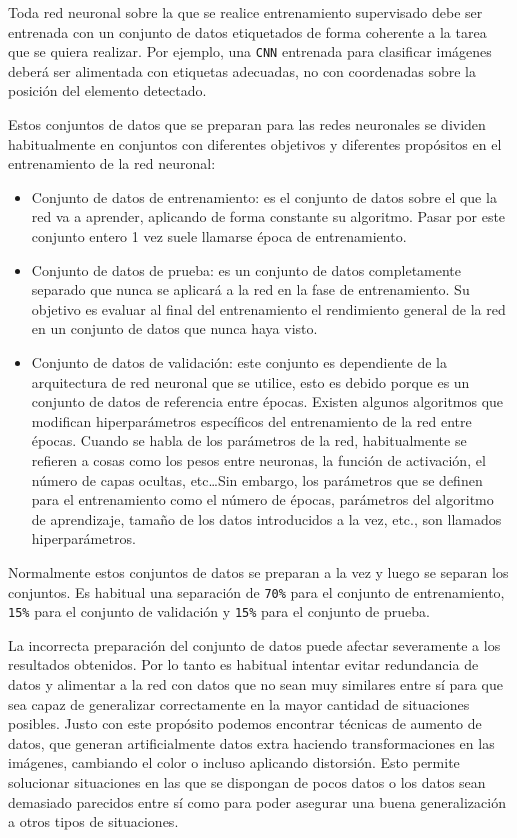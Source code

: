 Toda red neuronal sobre la que se realice entrenamiento supervisado debe ser entrenada con un conjunto de datos etiquetados de forma coherente a la tarea que se quiera realizar. Por ejemplo, una \texttt{CNN} 
entrenada para clasificar imágenes deberá ser alimentada con etiquetas adecuadas, no con coordenadas sobre la posición del elemento detectado.

Estos conjuntos de datos que se preparan para las redes neuronales se dividen habitualmente en conjuntos con diferentes objetivos y diferentes propósitos en el entrenamiento de la red neuronal:

\begin{itemize}
    \item Conjunto de datos de entrenamiento: es el conjunto de datos sobre el que la red va a aprender, aplicando de forma constante su algoritmo. Pasar por este conjunto entero 1 vez suele llamarse época 
    de entrenamiento.
    \item Conjunto de datos de prueba: es un conjunto de datos completamente separado que nunca se aplicará a la red en la fase de entrenamiento. Su objetivo es evaluar al final del entrenamiento el 
    rendimiento general de la red en un conjunto de datos que nunca haya visto.
    \item Conjunto de datos de validación: este conjunto es dependiente de la arquitectura de red neuronal que se utilice, esto es debido porque es un conjunto de datos de referencia entre épocas. Existen 
    algunos algoritmos que modifican hiperparámetros específicos del entrenamiento de la red entre épocas.\newline
    Cuando se habla de los parámetros de la red, habitualmente se refieren a cosas como los pesos entre neuronas, la función de activación, el número de capas ocultas, etc\dots Sin embargo, los parámetros 
    que se definen para el entrenamiento como el número de épocas, parámetros del algoritmo de aprendizaje, tamaño de los datos introducidos a la vez, etc., son llamados hiperparámetros.
\end{itemize}

Normalmente estos conjuntos de datos se preparan a la vez y luego se separan los conjuntos. Es habitual una separación de \texttt{70\%} para el conjunto de entrenamiento, \texttt{15\%} para el conjunto de 
validación y \texttt{15\%} para el conjunto de prueba.

La incorrecta preparación del conjunto de datos puede afectar severamente a los resultados obtenidos. Por lo tanto es habitual intentar evitar redundancia de datos y alimentar a la red con datos que no sean muy 
similares entre sí para que sea capaz de generalizar correctamente en la mayor cantidad de situaciones posibles.\newline
Justo con este propósito podemos encontrar técnicas de aumento de datos, que generan artificialmente datos extra haciendo transformaciones en las imágenes, cambiando el color o incluso aplicando distorsión. 
Esto permite solucionar situaciones en las que se dispongan de pocos datos o los datos sean demasiado parecidos entre sí como para poder asegurar una buena generalización a otros tipos de situaciones.

